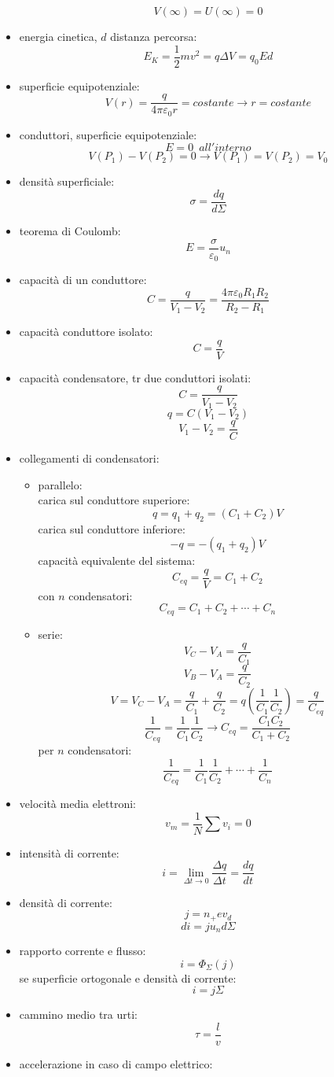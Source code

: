 \documentclass[a4paper,12pt, oneside]{book}
\begin{document}
\begin{itemize}
$$V(\infty)=U(\infty)=0$$
\item energia cinetica, $d$ distanza percorsa:
$$E_K=\frac{1}{2}mv^2=q\Delta V=q_0Ed$$
\item superficie equipotenziale:
$$V(r)=\frac{q}{4\pi\varepsilon_0r}=costante\longrightarrow r=costante$$
\item conduttori, superficie equipotenziale:
$$E=0\,\,\,all'interno$$
$$V(P_1)-V(P_2)=0\longrightarrow V(P_1)=V(P_2)=V_0$$
\item densità superficiale:
$$\sigma=\frac{dq}{d\Sigma}$$
\item teorema di Coulomb:
$$E=\frac{\sigma}{\varepsilon_0}u_n$$
\item capacità di un conduttore:
$$C=\frac{q}{V_1-V_2}=\frac{4\pi\varepsilon_0R_1R_2}{R_2-R_1}$$
\item capacità conduttore isolato:
$$C=\frac{q}{V}$$
\item capacità condensatore, tr due conduttori isolati:
$$C=\frac{q}{V_1-V_2}$$
$$q=C(V_1-V_2)$$
$$V_1-V_2=\frac{q}{C}$$
\item collegamenti di condensatori:
\begin{itemize}
\item parallelo:\\
carica sul conduttore superiore:
$$q=q_1+q_2=(C_1+C_2)V$$
carica sul conduttore inferiore:
$$-q=-(q_1+q_2)V$$
capacità equivalente del sistema:
$$C_{eq}=\frac{q}{V}=C_1+C_2$$
con $n$ condensatori:
$$C_{eq}=C_1+C_2+\cdots+C_n$$
\item serie:
$$V_C-V_A=\frac{q}{C_1}$$
$$V_B-V_A=\frac{q}{C_2}$$
$$V=V_C-V_A=\frac{q}{C_1}+\frac{q}{C_2}=q\left(\frac{1}{C_1}\frac{1}{C_2}\right)=\frac{q}{C_{eq}}$$
$$\frac{1}{C_{eq}}=\frac{1}{C_1}\frac{1}{C_2}\longrightarrow C_{eq}=\frac{C_1C_2}{C_1+C_2}$$
per $n$ condensatori:
$$\frac{1}{C_{eq}}=\frac{1}{C_1}\frac{1}{C_2}+\cdots+\frac{1}{C_n}$$
\end{itemize}
\item velocità media elettroni:
$$v_m=\frac{1}{N}\sum v_i=0$$
\item intensità di corrente:
$$i=\lim_{\Delta t\to 0}\frac{\Delta q}{\Delta t}=\frac{dq}{dt}$$
\item densità di corrente:
$$j=n_+ev_d$$
$$di=ju_nd\Sigma$$
\item rapporto corrente e flusso:
$$i=\Phi_\Sigma(j)$$
se superficie ortogonale e densità di corrente:
$$i=j\Sigma$$
\item cammino medio tra urti:
$$\tau=\frac{l}{v}$$ 
\item accelerazione in caso di campo elettrico:

\end{itemize}
\end{document}

